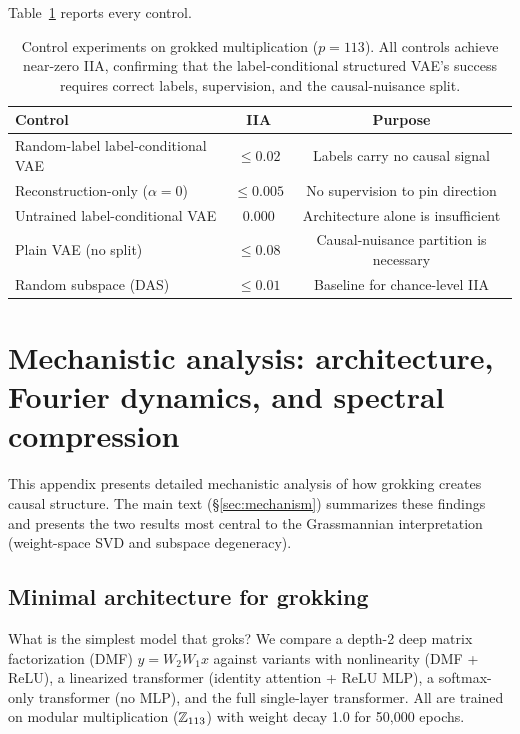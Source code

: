 \vspace{0.5em}
Table~\ref{tab:controls} reports every control.

\begin{table}[H]
\centering
\small
\begin{tabular}{lcc}
\toprule
\textbf{Control} & \textbf{IIA} & \textbf{Purpose} \\
\midrule
Random-label label-conditional VAE    & $\leq 0.02$  & Labels carry no causal signal \\
Reconstruction-only ($\alpha{=}0$) & $\leq 0.005$ & No supervision to pin direction \\
Untrained label-conditional VAE       & 0.000        & Architecture alone is insufficient \\
Plain VAE (no split)   & $\leq 0.08$  & Causal-nuisance partition is necessary \\
Random subspace (DAS)  & $\leq 0.01$  & Baseline for chance-level IIA \\
\bottomrule
\end{tabular}
\caption{Control experiments on grokked multiplication ($p = 113$).
All controls achieve near-zero IIA, confirming that the label-conditional structured VAE's
success requires correct labels, supervision, and the causal-nuisance split.}
\label{tab:controls}
\end{table}

\section{Mechanistic analysis: architecture, Fourier dynamics, and spectral compression}
\label{app:mechanistic}

This appendix presents detailed mechanistic analysis of how grokking
creates causal structure. The main text (\S\ref{sec:mechanism})
summarizes these findings and presents the two results most central to
the Grassmannian interpretation (weight-space SVD and subspace
degeneracy).

\subsection{Minimal architecture for grokking}
\label{app:dmf}

What is the simplest model that groks? We compare a depth-2 deep matrix
factorization (DMF) $y = W_2 W_1 x$ against variants with nonlinearity
(DMF + ReLU), a linearized transformer (identity attention + ReLU MLP),
a softmax-only transformer (no MLP), and the full single-layer transformer.
All are trained on modular multiplication ($\mathbb{Z}_{113}$) with weight decay 1.0
for 50{,}000 epochs.

